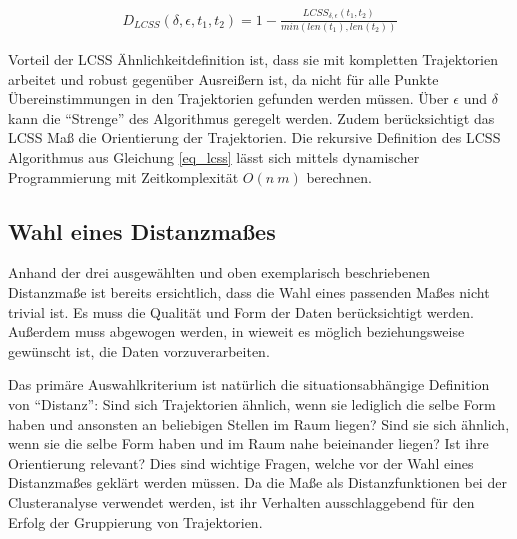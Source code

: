 \begin{ceqn}
\begin{align}
\label{eq_lcss_distance}
    D_{LCSS}(\delta, \epsilon, t_1, t_2) = 1 - \frac{LCSS_{\delta, \epsilon}(t_1, t_2)}{min(len(t_1), len(t_2))}
\end{align}
\end{ceqn}


Vorteil der LCSS Ähnlichkeitdefinition ist, dass sie mit kompletten Trajektorien arbeitet und robust
gegenüber Ausreißern ist, da nicht für alle Punkte Übereinstimmungen in den Trajektorien gefunden werden müssen.
Über $\epsilon$ und $\delta$ kann die ``Strenge'' des Algorithmus geregelt werden.
Zudem berücksichtigt das LCSS Maß die Orientierung der Trajektorien.
Die rekursive Definition des LCSS Algorithmus aus Gleichung \ref{eq_lcss} lässt sich mittels dynamischer Programmierung
mit Zeitkomplexität $O(n\ m)$ berechnen.

\subsection{Wahl eines Distanzmaßes}

Anhand der drei ausgewählten und oben exemplarisch beschriebenen Distanzmaße ist bereits ersichtlich,
dass die Wahl eines passenden Maßes nicht trivial ist. Es muss die Qualität und Form der Daten berücksichtigt werden.
Außerdem muss abgewogen werden, in wieweit es möglich beziehungsweise gewünscht ist, die Daten vorzuverarbeiten.

Das primäre Auswahlkriterium ist natürlich die situationsabhängige Definition von ``Distanz'':
Sind sich Trajektorien ähnlich, wenn sie lediglich die selbe Form haben und ansonsten an beliebigen Stellen im Raum liegen?
Sind sie sich ähnlich, wenn sie die selbe Form haben und im Raum nahe beieinander liegen? Ist ihre Orientierung relevant?
Dies sind wichtige Fragen, welche vor der Wahl eines Distanzmaßes geklärt werden müssen.
Da die Maße als Distanzfunktionen bei der Clusteranalyse verwendet werden, ist ihr Verhalten ausschlaggebend
für den Erfolg der Gruppierung von Trajektorien.


